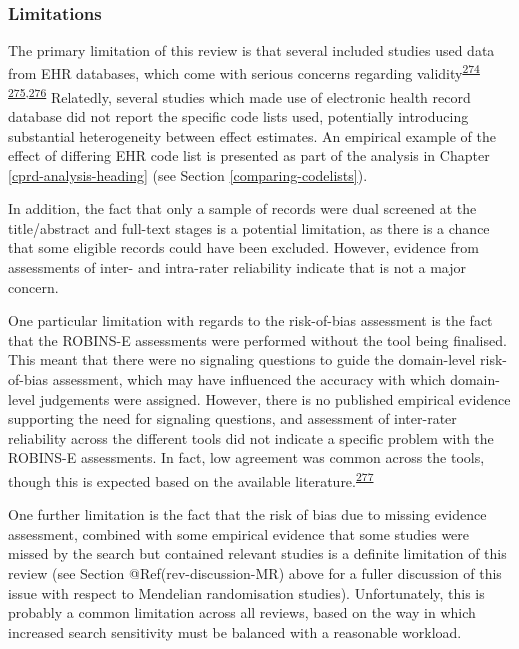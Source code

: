 \documentclass[a4paper, twoside]{templates/ociamthesis}
\begin{document}
~

\hypertarget{limitations}{%
\subsubsection{Limitations}\label{limitations}}

The primary limitation of this review is that several included studies used data from EHR databases, which come with serious concerns regarding validity\textsuperscript{\protect\hyperlink{ref-hsieh2019}{274}} \textsuperscript{\protect\hyperlink{ref-mcguinness2019validity}{275},\protect\hyperlink{ref-wilkinson2018}{276}} Relatedly, several studies which made use of electronic health record database did not report the specific code lists used, potentially introducing substantial heterogeneity between effect estimates. An empirical example of the effect of differing EHR code list is presented as part of the analysis in Chapter \ref{cprd-analysis-heading} (see Section \ref{comparing-codelists}).

In addition, the fact that only a sample of records were dual screened at the title/abstract and full-text stages is a potential limitation, as there is a chance that some eligible records could have been excluded. However, evidence from assessments of inter- and intra-rater reliability indicate that is not a major concern.

One particular limitation with regards to the risk-of-bias assessment is the fact that the ROBINS-E assessments were performed without the tool being finalised. This meant that there were no signaling questions to guide the domain-level risk-of-bias assessment, which may have influenced the accuracy with which domain-level judgements were assigned. However, there is no published empirical evidence supporting the need for signaling questions, and assessment of inter-rater reliability across the different tools did not indicate a specific problem with the ROBINS-E assessments. In fact, low agreement was common across the tools, though this is expected based on the available literature.\textsuperscript{\protect\hyperlink{ref-jeyaraman2020}{277}}

One further limitation is the fact that the risk of bias due to missing evidence assessment, combined with some empirical evidence that some studies were missed by the search but contained relevant studies is a definite limitation of this review (see Section @Ref(rev-discussion-MR) above for a fuller discussion of this issue with respect to Mendelian randomisation studies). Unfortunately, this is probably a common limitation across all reviews, based on the way in which increased search sensitivity must be balanced with a reasonable workload.
\end{document}
